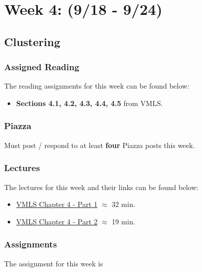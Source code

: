 \clearpage
\chapter{Week 4: (9/18 - 9/24)}

\section{Clustering}

\subsection{Assigned Reading}

The reading assignments for this week can be found below:

\begin{itemize}
    \item \textbf{Sections 4.1, 4.2, 4.3, 4.4, 4.5} from VMLS.
\end{itemize}

\subsection{Piazza}

Must post / respond to at least \textbf{four} Piazza posts this week.  

\subsection{Lectures}

The lectures for this week and their links can be found below:

\begin{itemize}
    \item \href{https://www.youtube.com/watch?v=liaZ_SCuE1w&list=PLoROMvodv4rMz-WbFQtNUsUElIh2cPmN9&index=14}{VMLS Chapter 4 - Part 1} $\approx$ 32 min.
    \item \href{https://www.youtube.com/watch?v=a4GjONqojzM&list=PLoROMvodv4rMz-WbFQtNUsUElIh2cPmN9&index=15}{VMLS Chapter 4 - Part 2} $\approx$ 19 min.
\end{itemize}

\subsection{Assignments}

The assignment for this week is   

